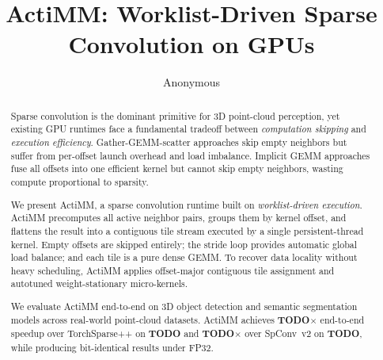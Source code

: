 \documentclass[sigplan,anonymous,review,10pt]{acmart}
\newcommand{\sysname}{ActiMM\xspace}
\begin{document}
\title{\sysname: Worklist-Driven Sparse Convolution on GPUs}

\author{Anonymous}

\begin{abstract}
Sparse convolution is the dominant primitive for 3D point-cloud perception,
yet existing GPU runtimes face a fundamental tradeoff between
\emph{computation skipping} and \emph{execution efficiency}.
Gather-GEMM-scatter approaches skip empty neighbors but suffer from
per-offset launch overhead and load imbalance.
Implicit GEMM approaches fuse all offsets into one efficient kernel but
cannot skip empty neighbors, wasting compute proportional to sparsity.

We present \sysname, a sparse convolution runtime built on
\emph{worklist-driven execution}.
\sysname precomputes all active neighbor pairs, groups them by kernel
offset, and flattens the result into a contiguous tile stream executed by a
single persistent-thread kernel.
Empty offsets are skipped entirely; the stride loop provides automatic
global load balance; and each tile is a pure dense GEMM.
To recover data locality without heavy scheduling, \sysname applies
offset-major contiguous tile assignment and autotuned weight-stationary
micro-kernels.

We evaluate \sysname end-to-end on 3D object detection and semantic
segmentation models across real-world point-cloud datasets.
\sysname achieves \textbf{TODO}$\times$ end-to-end speedup over
TorchSparse++ on \textbf{TODO} and \textbf{TODO}$\times$ over SpConv~v2
on \textbf{TODO}, while producing bit-identical results under FP32.
\end{abstract}

\maketitle





\end{document}
